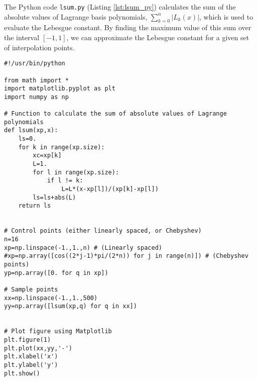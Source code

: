 \documentclass{article}
\begin{document}
The Python code \texttt{lsum.py} (Listing \ref{lst:lsum_py}) calculates the sum of the absolute values of Lagrange basis polynomials, $\sum_{k=0}^{n} |L_k(x)|$, which is used to evaluate the Lebesgue constant. By finding the maximum value of this sum over the interval $[−1, 1]$, we can approximate the Lebesgue constant for a given set of interpolation points.

\begin{lstlisting}
#!/usr/bin/python

from math import *
import matplotlib.pyplot as plt
import numpy as np

# Function to calculate the sum of absolute values of Lagrange polynomials
def lsum(xp,x):
    ls=0.
    for k in range(xp.size):
        xc=xp[k]
        L=1.
        for l in range(xp.size):
            if l != k:
                L=L*(x-xp[l])/(xp[k]-xp[l])
        ls=ls+abs(L)
    return ls


# Control points (either linearly spaced, or Chebyshev)
n=16
xp=np.linspace(-1.,1.,n) # (Linearly spaced)
#xp=np.array([cos((2*j-1)*pi/(2*n)) for j in range(n)]) # (Chebyshev points)
yp=np.array([0. for q in xp])

# Sample points
xx=np.linspace(-1.,1.,500)
yy=np.array([lsum(xp,q) for q in xx])


# Plot figure using Matplotlib
plt.figure(1)
plt.plot(xx,yy,'-')
plt.xlabel('x')
plt.ylabel('y')
plt.show()
\end{lstlisting}
\end{document}
